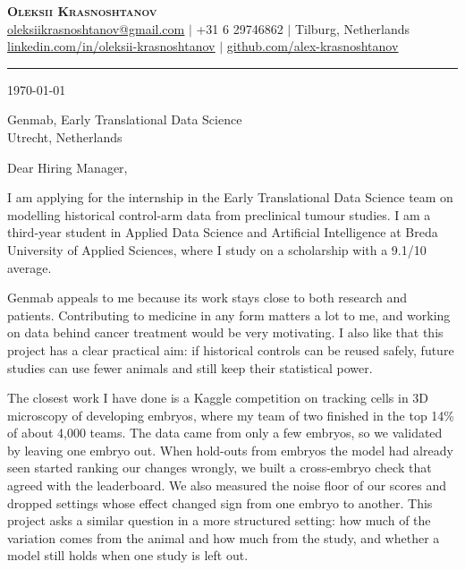 \documentclass[letterpaper,11pt]{article}
\begin{document}
\begin{center}
    \textbf{\Huge \scshape Oleksii Krasnoshtanov} \\ \vspace{1pt}
    \small
    \href{mailto:oleksiikrasnoshtanov@gmail.com}{\underline{oleksiikrasnoshtanov@gmail.com}} $|$
    +31 6 29746862 $|$
    Tilburg, Netherlands \\ \vspace{2pt}
    \href{https://www.linkedin.com/in/oleksii-krasnoshtanov/}{\underline{linkedin.com/in/oleksii-krasnoshtanov}} $|$
    \href{https://github.com/alex-krasnoshtanov}{\underline{github.com/alex-krasnoshtanov}}
\end{center}
\vspace{-4pt}\noindent\rule{\textwidth}{0.4pt}

\today

Genmab, Early Translational Data Science \\
Utrecht, Netherlands

Dear Hiring Manager,

I am applying for the internship in the Early Translational Data Science team
on modelling historical control-arm data from preclinical tumour studies. I am
a third-year student in Applied Data Science and Artificial Intelligence at
Breda University of Applied Sciences, where I study on a scholarship with a
9.1/10 average.

Genmab appeals to me because its work stays close to both research and
patients. Contributing to medicine in any form matters a lot to me, and working
on data behind cancer treatment would be very motivating. I also like that this
project has a clear practical aim: if historical controls can be reused safely,
future studies can use fewer animals and still keep their statistical power.

The closest work I have done is a Kaggle competition on tracking cells in 3D
microscopy of developing embryos, where my team of two finished in the top 14\%
of about 4,000 teams. The data came from only a few embryos, so we validated by
leaving one embryo out. When hold-outs from embryos the model had already seen
started ranking our changes wrongly, we built a cross-embryo check that agreed
with the leaderboard. We also measured the noise floor of our scores and
dropped settings whose effect changed sign from one embryo to another. This
project asks a similar question in a more structured setting: how much of the
variation comes from the animal and how much from the study, and whether a
model still holds when one study is left out.
\end{document}

